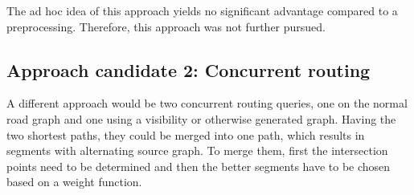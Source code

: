 		The ad hoc idea of this approach yields no significant advantage compared to a preprocessing.
		Therefore, this approach was not further pursued.
		
		
	
	\subsection{Approach candidate 2: Concurrent routing}
	
		A different approach would be two concurrent routing queries, one on the normal road graph and one using a visibility or otherwise generated graph.
		Having the two shortest paths, they could be merged into one path, which results in segments with alternating source graph.
		To merge them, first the intersection points need to be determined and then the better segments have to be chosen based on a weight function.
		
